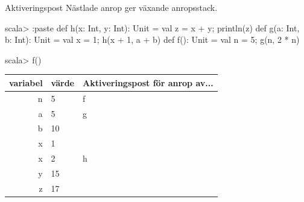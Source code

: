 %
%
%

\begin{Slide}{Aktiveringspost}\SlideFontSmall
Nästlade anrop ger växande anropsstack.
\begin{REPL}
scala> :paste
def h(x: Int, y: Int): Unit = { val z = x + y; println(z) }
def g(a: Int, b: Int): Unit = { val x = 1; h(x + 1, a + b) }
def f(): Unit = { val n = 5; g(n, 2 * n) }

scala> f()

\end{REPL}

\pause
{}

\begin{tabular}{|r | l | l |} \hline

variabel & värde & Aktiveringspost för anrop av... \\ \hline \hline
\pause
 n & 5 & f \\ \hline
 \pause
 a & 5 & g \\
 b & 10 &  \\
 x & 1  &  \\  \hline
 \pause
 x & 2  & h \\
 y & 15 &  \\
 z & 17 & \\ \hline
\end{tabular}
\end{Slide}

